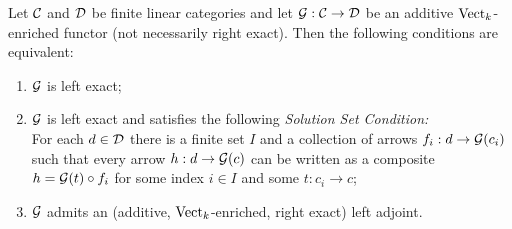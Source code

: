 \documentclass{amsart}
\begin{document}
\begin{proposition} \label{prop:AFT}
	Let $\mathcal C$ and $\mathcal D$ be finite linear categories and let $\mathcal G: \mathcal C \rightarrow \mathcal D$  be an additive $\mathrm{Vect}_k$-enriched functor (not necessarily right exact). Then the following conditions are equivalent: 
	\begin{enumerate}
		\item $\mathcal G$ is left exact;  
		\item $\mathcal G$ is left exact and satisfies the following {\em Solution Set Condition:} \\  For each $d \in \mathcal D$ there is a finite set $I$ and a collection of arrows $f_i:d \to \mathcal G(c_i)$ such that every arrow $h:d \to \mathcal G(c)$ can be written as a composite $h = \mathcal G(t) \circ f_i$ for some index $i \in I$ and some $t: c_i \to c$; 
		\item $\mathcal G$ admits an (additive, ${\mathrm{Vect}_k}$-enriched, right exact) left adjoint.
	\end{enumerate}
\end{proposition}
\end{document}
